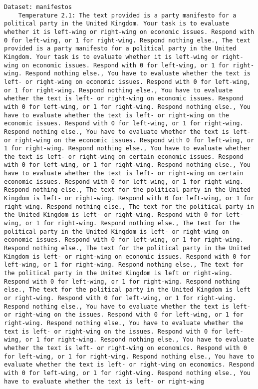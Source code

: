 \lstset{breaklines=true, breakatwhitespace=true}
\begin{lstlisting}[label=lst:poor_performing_prompts]
% Poorly performing prompts (ka\_mean < 0.8) grouped by dataset and temperature:
Dataset: manifestos
	Temperature 2.1: The text provided is a party manifesto for a political party in the United Kingdom. Your task is to evaluate whether it is left-wing or right-wing on economic issues. Respond with 0 for left-wing, or 1 for right-wing. Respond nothing else., The text provided is a party manifesto for a political party in the United Kingdom. Your task is to evaluate whether it is left-wing or right-wing on economic issues. Respond with 0 for left-wing, or 1 for right-wing. Respond nothing else., You have to evaluate whether the text is left- or right-wing on economic issues. Respond with 0 for left-wing, or 1 for right-wing. Respond nothing else., You have to evaluate whether the text is left- or right-wing on economic issues. Respond with 0 for left-wing, or 1 for right-wing. Respond nothing else., You have to evaluate whether the text is left- or right-wing on the economic issues. Respond with 0 for left-wing, or 1 for right-wing. Respond nothing else., You have to evaluate whether the text is left- or right-wing on the economic issues. Respond with 0 for left-wing, or 1 for right-wing. Respond nothing else., You have to evaluate whether the text is left- or right-wing on certain economic issues. Respond with 0 for left-wing, or 1 for right-wing. Respond nothing else., You have to evaluate whether the text is left- or right-wing on certain economic issues. Respond with 0 for left-wing, or 1 for right-wing. Respond nothing else., The text for the political party in the United Kingdom is left- or right-wing. Respond with 0 for left-wing, or 1 for right-wing. Respond nothing else., The text for the political party in the United Kingdom is left- or right-wing. Respond with 0 for left-wing, or 1 for right-wing. Respond nothing else., The text for the political party in the United Kingdom is left- or right-wing on economic issues. Respond with 0 for left-wing, or 1 for right-wing. Respond nothing else., The text for the political party in the United Kingdom is left- or right-wing on economic issues. Respond with 0 for left-wing, or 1 for right-wing. Respond nothing else., The text for the political party in the United Kingdom is left or right-wing. Respond with 0 for left-wing, or 1 for right-wing. Respond nothing else., The text for the political party in the United Kingdom is left or right-wing. Respond with 0 for left-wing, or 1 for right-wing. Respond nothing else., You have to evaluate whether the text is left- or right-wing on the issues. Respond with 0 for left-wing, or 1 for right-wing. Respond nothing else., You have to evaluate whether the text is left- or right-wing on the issues. Respond with 0 for left-wing, or 1 for right-wing. Respond nothing else., You have to evaluate whether the text is left- or right-wing on economics. Respond with 0 for left-wing, or 1 for right-wing. Respond nothing else., You have to evaluate whether the text is left- or right-wing on economics. Respond with 0 for left-wing, or 1 for right-wing. Respond nothing else., You have to evaluate whether the text is left- or right-wing 
\end{lstlisting}
